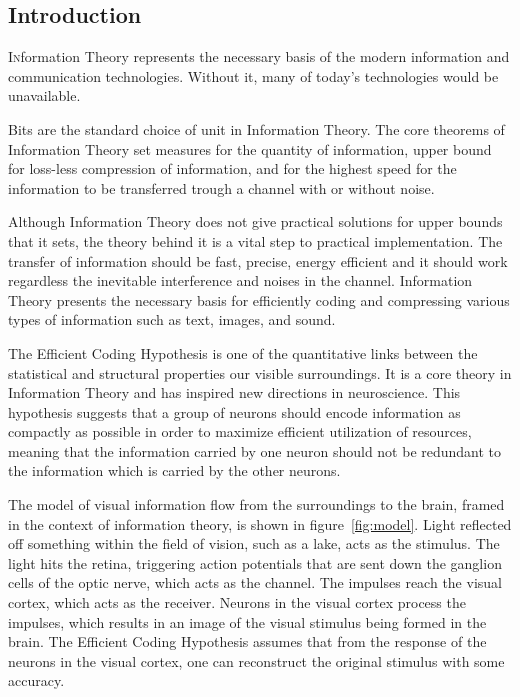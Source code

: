 \documentclass[twoside]{article}
\begin{document}
\begin{multicols}{2} %

\section{Introduction}

\lettrine[nindent=0em,lines=3]{I}nformation Theory represents the necessary basis of the modern information and communication technologies. Without it, many of today's technologies would be unavailable.

Bits are the standard choice of unit in Information Theory. The core theorems of Information Theory set measures for the quantity of information, upper bound for loss-less compression of information, and for the highest speed for the information to be transferred trough a channel with or without noise. 

Although Information Theory does not give practical solutions for upper bounds that it sets, the theory behind it is a vital step to practical implementation. The transfer of information should be fast, precise, energy efficient and it should work regardless the inevitable interference and noises in the channel. Information Theory presents the necessary basis for efficiently coding and compressing various types of information such as text, images, and sound. 

The Efficient Coding Hypothesis is one of the quantitative links between the statistical and structural properties our visible surroundings. It is a core theory in Information Theory and has inspired new directions in neuroscience. This hypothesis suggests that a group of neurons should encode information as compactly as possible in order to maximize efficient utilization of resources, meaning that the information carried by one neuron should not be redundant to the information which is carried by the other neurons. 

The model of visual information flow from the surroundings to the brain, framed in the context of information theory, is shown in figure~\ref{fig:model}. Light reflected off something within the field of vision, such as a lake, acts as the stimulus. The light hits the retina, triggering action potentials that are sent down the ganglion cells of the optic nerve, which acts as the channel. The impulses reach the visual cortex, which acts as the receiver. Neurons in the visual cortex process the impulses, which results in an image of the visual stimulus being formed in the brain. The Efficient Coding Hypothesis assumes that from the response of the neurons in the visual cortex, one can reconstruct the original stimulus with some accuracy. 


\end{multicols}
\end{document}
